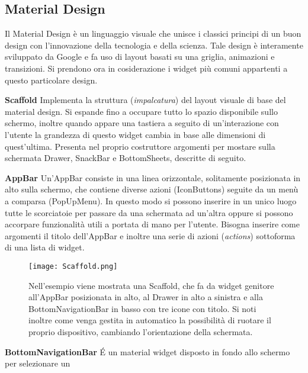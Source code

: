 	\subsection{Material Design}
	Il Material Design è un linguaggio visuale che unisce i classici principi di
	un buon design con l'innovazione della tecnologia e della scienza. 
	\cite{material} \newline
	Tale design è interamente sviluppato da Google e fa uso di layout basati su
	una griglia, animazioni e transizioni. Si prendono ora in cosiderazione i
	widget più comuni appartenti a questo particolare design.
	\begin{trivlist}
		\item \textbf{Scaffold} \newline
		Implementa la struttura (\textit{impalcatura}) del layout visuale di
		base del material design. Si espande fino a occupare tutto lo spazio
		disponibile sullo schermo, inoltre quando appare una tastiera a seguito
		di un'interazione con l'utente la grandezza di questo widget cambia in
		base alle dimensioni di quest'ultima. Presenta nel proprio costruttore
		argomenti per mostare sulla schermata Drawer, SnackBar e BottomSheets,
		descritte di seguito. 
		\item \textbf{AppBar} \newline
		Un'AppBar consiste in una linea orizzontale, solitamente posizionata in
		alto sulla schermo, che contiene diverse azioni (IconButtons) seguite da
		un menù a comparsa (PopUpMenu). In questo modo si possono inserire in un
		unico luogo tutte le scorciatoie per passare da una schermata ad
		un'altra oppure si possono accorpare funzionalità utili a portata di
		mano per l'utente. Bisogna inserire come argomenti il titolo dell'AppBar
		e inoltre una serie di azioni (\textit{actions}) sottoforma di una lista
		di widget. 
		\begin{figure}
			\centering
			\texttt{[image: Scaffold.png]}			
			\caption{Nell'esempio viene mostrata una Scaffold, che fa da widget
			genitore all'AppBar posizionata in alto, al Drawer in alto a
			sinistra e alla BottomNavigationBar in basso con tre icone con
			titolo. Si noti inoltre come venga gestita in automatico la
			possibilità di ruotare il proprio dispositivo, cambiando
			l'orientazione della schermata.}
		\end{figure}
		\item \textbf{BottomNavigationBar} \newline
		\'E un material widget disposto in fondo allo schermo per selezionare un

\end{trivlist}
